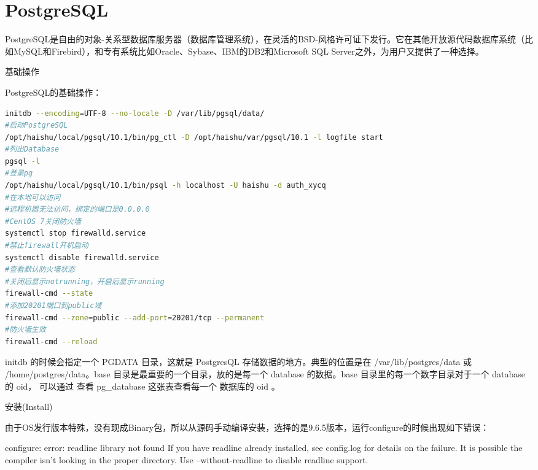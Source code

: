 \documentclass[12pt]{book}
\makeatletter
\numberwithin{dummy}{section}
\theoremstyle{ocrenumbox}
\theoremstyle{blacknumex}
\theoremstyle{blacknumbox}
\theoremstyle{ocrenum}
\renewcommand{\section}{\@startsection{section}{1}{\z@}
	{-4ex \@plus -1ex \@minus -.4ex}
	{1ex \@plus.2ex }
	{\normalfont\large\sffamily\bfseries}}
\renewcommand{\subsection}{\@startsection {subsection}{2}{\z@}
	{-3ex \@plus -0.1ex \@minus -.4ex}
	{0.5ex \@plus.2ex }
	{\normalfont\sffamily\bfseries}}
\makeatother
\begin{document}
\chapter{PostgreSQL}

PostgreSQL是自由的对象-关系型数据库服务器（数据库管理系统），在灵活的BSD-风格许可证下发行。它在其他开放源代码数据库系统（比如MySQL和Firebird），和专有系统比如Oracle、Sybase、IBM的DB2和Microsoft SQL Server之外，为用户又提供了一种选择。

\section{基础操作}

PostgreSQL的基础操作：

\begin{lstlisting}[language=Bash]
initdb --encoding=UTF-8 --no-locale -D /var/lib/pgsql/data/
#启动PostgreSQL
/opt/haishu/local/pgsql/10.1/bin/pg_ctl -D /opt/haishu/var/pgsql/10.1 -l logfile start
#列出Database
pgsql -l
#登录pg
/opt/haishu/local/pgsql/10.1/bin/psql -h localhost -U haishu -d auth_xycq
#在本地可以访问
#远程机器无法访问，绑定的端口是0.0.0.0
#CentOS 7关闭防火墙
systemctl stop firewalld.service
#禁止firewall开机启动
systemctl disable firewalld.service
#查看默认防火墙状态
#关闭后显示notrunning，开启后显示running
firewall-cmd --state
#添加20201端口到public域
firewall-cmd --zone=public --add-port=20201/tcp --permanent
#防火墙生效
firewall-cmd --reload
\end{lstlisting}

initdb 的时候会指定一个 PGDATA 目录，这就是 PostgresQL 存储数据的地方。典型的位置是在 /var/lib/postgres/data 或 /home/postgres/data。base 目录是最重要的一个目录，放的是每一个 database 的数据。base 目录里的每一个数字目录对于一个 database 的 oid， 可以通过 查看 pg\_database 这张表查看每一个 数据库的 oid 。


\subsection{安装(Install)}

由于OS发行版本特殊，没有现成Binary包，所以从源码手动编译安装，选择的是9.6.5版本，运行configure的时候出现如下错误：

configure: error: readline library not found
If you have readline already installed, see config.log for details on the
failure.  It is possible the compiler isn't looking in the proper directory.
Use --without-readline to disable readline support.
\end{document}
